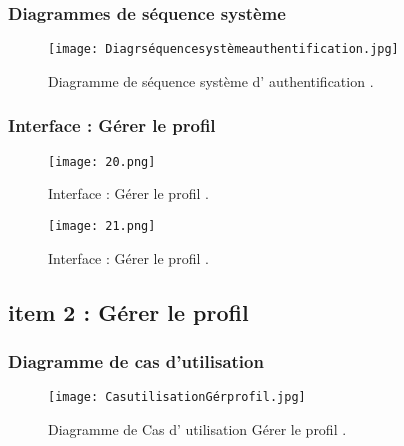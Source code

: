\subsubsection{Diagrammes de séquence système }
\begin{figure}[ht]
	\centering
	\texttt{[image: Diagrséquencesystèmeauthentification.jpg]}
	\caption{Diagramme de séquence système d' authentification .}
	\label{fig:Diagramme de séquence système d' authentification }
\end{figure}
\FloatBarrier

\subsubsection{ Interface : Gérer le profil  }


\begin{figure}[ht]
	\centering
	\texttt{[image: 20.png]}
	\caption{Interface : Gérer le profil .}
	\label{fig:Interface : Gérer le profil }
\end{figure}
\FloatBarrier
\begin{figure}[ht]
	\centering
	\texttt{[image: 21.png]}
	\caption{Interface : Gérer le profil .}
	\label{fig:Interface : Gérer le profil }
\end{figure}
\FloatBarrier
\clearpage
\subsection{item 2 : Gérer le profil}
\subsubsection{Diagramme de cas d’utilisation }


\begin{figure}[ht]
	\centering
	\texttt{[image: CasutilisationGérprofil.jpg]}
	\caption{Diagramme de Cas d' utilisation Gérer le profil .}
	\label{fig:Gérer le profil }
\end{figure}
\FloatBarrier


